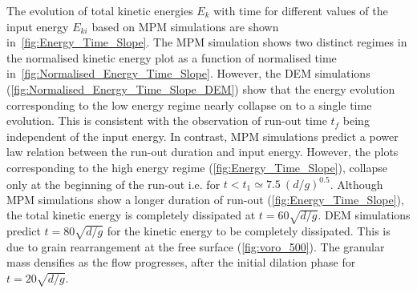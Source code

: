 The evolution of total kinetic energies $E_k$ with time for different values of 
the input energy $E_{ki}$ based on MPM simulations are shown 
in~\cref{fig:Energy_Time_Slope}. The MPM simulation shows two distinct regimes 
in the normalised kinetic energy plot as a function of normalised time 
in~\cref{fig:Normalised_Energy_Time_Slope}. However, the DEM simulations 
(\cref{fig:Normalised_Energy_Time_Slope_DEM}) show that the energy evolution 
corresponding to the low energy regime nearly collapse on to a single time 
evolution. This is consistent with the observation of run-out time $t_f$ being 
independent of the input energy. In contrast, MPM simulations predict a power 
law relation between the run-out duration and input energy. However, the 
plots corresponding to the high energy regime (\cref{fig:Energy_Time_Slope}), 
collapse only at the beginning of the run-out i.e. for $t < t_1 \simeq 7.5 \ 
(d/g)^{0.5}$. Although MPM simulations show a longer duration of run-out 
(\cref{fig:Energy_Time_Slope}), the total kinetic energy is completely 
dissipated at $t = 60 \sqrt{d/g}$. DEM simulations predict $t = 80 \sqrt{d/g}$ 
for the kinetic energy to be completely dissipated. This is due to grain 
rearrangement at the free surface (\cref{fig:voro_500}). The granular mass 
densifies as the flow progresses, after the initial dilation phase for $t = 
20\sqrt{d/g}$.

